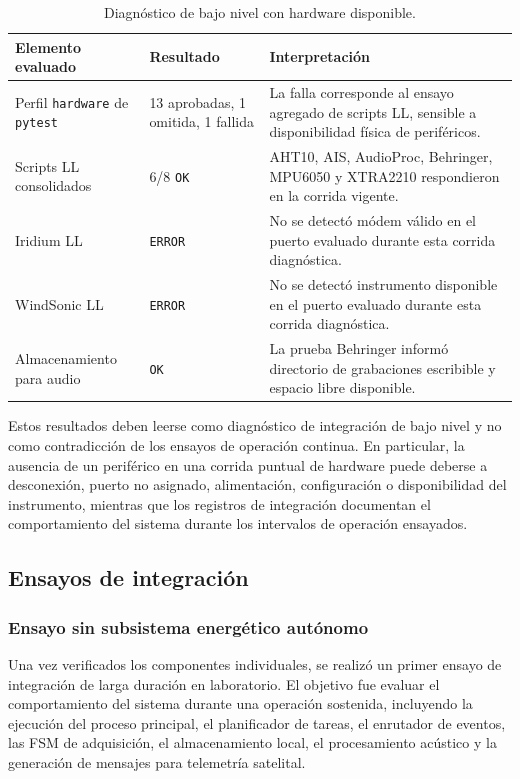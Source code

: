 \begin{table}[htpb]
\centering
\small
\caption{Diagnóstico de bajo nivel con hardware disponible.}
\label{tab:diagnostico_ll_hardware}
\begin{tabularx}{\textwidth}{p{} p{} X}
\toprule
\textbf{Elemento evaluado} & \textbf{Resultado} & \textbf{Interpretación} \\
\midrule
Perfil \texttt{hardware} de \texttt{pytest} & 13 aprobadas, 1 omitida, 1 fallida & La falla corresponde al ensayo agregado de scripts LL, sensible a disponibilidad física de periféricos. \\
Scripts LL consolidados & 6/8 \texttt{OK} & AHT10, AIS, AudioProc, Behringer, MPU6050 y XTRA2210 respondieron en la corrida vigente. \\
Iridium LL & \texttt{ERROR} & No se detectó módem válido en el puerto evaluado durante esta corrida diagnóstica. \\
WindSonic LL & \texttt{ERROR} & No se detectó instrumento disponible en el puerto evaluado durante esta corrida diagnóstica. \\
Almacenamiento para audio & \texttt{OK} & La prueba Behringer informó directorio de grabaciones escribible y espacio libre disponible. \\
\bottomrule
\end{tabularx}
\end{table}

Estos resultados deben leerse como diagnóstico de integración de bajo nivel y no como contradicción de los ensayos de operación continua. En particular, la ausencia de un periférico en una corrida puntual de hardware puede deberse a desconexión, puerto no asignado, alimentación, configuración o disponibilidad del instrumento, mientras que los registros de integración documentan el comportamiento del sistema durante los intervalos de operación ensayados.

\clearpage
\subsection{Ensayos de integración}

\subsubsection{Ensayo sin subsistema energético autónomo}

Una vez verificados los componentes individuales, se realizó un primer ensayo de integración de larga duración en laboratorio. El objetivo fue evaluar el comportamiento del sistema durante una operación sostenida, incluyendo la ejecución del proceso principal, el planificador de tareas, el enrutador de eventos, las FSM de adquisición, el almacenamiento local, el procesamiento acústico y la generación de mensajes para telemetría satelital.


